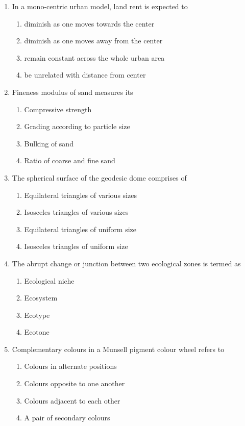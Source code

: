 \documentclass[12pt]{article}
\begin{document}
\begin{enumerate}[label=Q.\arabic*]
	\item In a mono-centric urban model, land rent is expected to
		\begin{enumerate}
			\item diminish as one moves towards the center
			\item diminish as one moves away from the center
			\item remain constant across the whole urban area
			\item be unrelated with distance from center
		\end{enumerate}

	\item Fineness modulus of sand measures its
		\begin{enumerate}
			\item Compressive strength
			\item Grading according to particle size
			\item Bulking of sand
			\item Ratio of coarse and fine sand
		\end{enumerate}

	\item The spherical surface of the geodesic dome comprises of
		\begin{enumerate}
			\item Equilateral triangles of various sizes
			\item Isosceles triangles of various sizes
			\item Equilateral triangles of uniform size
			\item Isosceles triangles of uniform size
		\end{enumerate}

	\item The abrupt change or junction between two ecological zones is termed as
		\begin{multicols}{2}
			\begin{enumerate}
				\item Ecological niche
				\item Ecosystem
				\item Ecotype
				\item Ecotone
			\end{enumerate}
		\end{multicols}

	\item Complementary colours in a Munsell pigment colour wheel refers to
		\begin{multicols}{2}
			\begin{enumerate}
				\item Colours in alternate positions
				\item Colours opposite to one another
				\item Colours adjacent to each other
				\item A pair of secondary colours
			\end{enumerate}
		\end{multicols}


\end{enumerate}
\end{document}
